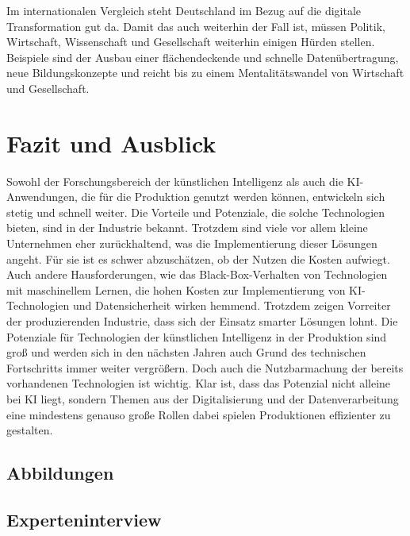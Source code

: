 \documentclass[a4paper,12pt, german]{report}
\begin{document}
Im internationalen Vergleich steht Deutschland im Bezug auf die digitale Transformation gut da. Damit das auch weiterhin der Fall ist, müssen Politik, Wirtschaft, Wissenschaft und Gesellschaft weiterhin einigen Hürden stellen. Beispiele sind der Ausbau einer flächendeckende und schnelle Datenübertragung, neue Bildungskonzepte und reicht bis zu einem Mentalitätswandel von Wirtschaft und Gesellschaft. \cite{36}

\chapter{Fazit und Ausblick}

Sowohl der Forschungsbereich der künstlichen Intelligenz als auch die KI-Anwendungen, die für die Produktion genutzt werden können, entwickeln sich stetig und schnell weiter. Die Vorteile und Potenziale, die solche Technologien bieten, sind in der Industrie bekannt. Trotzdem sind viele vor allem kleine Unternehmen eher zurückhaltend, was die Implementierung dieser Lösungen angeht. Für sie ist es schwer abzuschätzen, ob der Nutzen die Kosten aufwiegt. Auch andere Hausforderungen, wie das Black-Box-Verhalten von Technologien mit maschinellem Lernen, die hohen Kosten zur Implementierung von KI-Technologien und Datensicherheit wirken hemmend. Trotzdem zeigen Vorreiter der produzierenden Industrie, dass sich der Einsatz smarter Lösungen lohnt. Die Potenziale für Technologien der künstlichen Intelligenz in der Produktion sind groß und werden sich in den nächsten Jahren auch Grund des technischen Fortschritts immer weiter vergrößern. Doch auch die Nutzbarmachung der bereits vorhandenen Technologien ist wichtig.\newline
Klar ist, dass das Potenzial nicht alleine bei KI liegt, sondern Themen aus der Digitalisierung und der Datenverarbeitung eine mindestens genauso große Rollen dabei spielen Produktionen effizienter zu gestalten.

\listoffigures

\clearpage




\appendix
\section{Abbildungen}



\section{Experteninterview}
\end{document}
